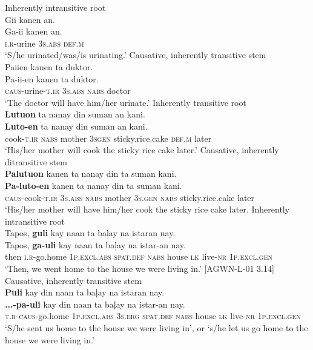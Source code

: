\ea
\label{bkm:Ref397062399}
    \ea
    Inherently intransitive root \\
    Gii  kanen  an. \\\smallskip
 \gll Ga-ii  kanen  an. \\
    \textsc{i.r}-urine  3\textsc{s.abs}  \textsc{def.m} \\
    \glt ‘S/he urinated/was/is urinating.'
    \ex
    Causative, inherently transitive stem \\
    Paiien  kanen  ta  duktor. \\\smallskip
 \gll Pa-ii-en  kanen  ta  duktor. \\
    \textsc{caus}-urine-\textsc{t.ir}  3\textsc{s.abs}  \textsc{nabs}  doctor \\
    \glt ‘The doctor will have him/her urinate.’
    \z
\z
\ea
    \ea
    \label{bkm:Ref444336543} 
    Inherently transitive root \\
    \textbf{Lutuon}  ta  nanay  din  suman  an  kani. \\\smallskip
 \gll  \textbf{Luto-en}  ta  nanay  din  suman  an  kani. \\
    cook-\textsc{t.ir}  \textsc{nabs}  mother  3\textsc{sgen}  sticky.rice.cake  \textsc{def.m} later \\
    \glt ‘His/her mother will cook the sticky rice cake later.'
    \ex
    \label{bkm:Ref395074775}
    Causative, inherently ditransitive stem \\
    \textbf{Palutuon}  kanen  ta  nanay  din  ta  suman  kani. \\\smallskip
 \gll \textbf{Pa-luto-en}  kanen  ta  nanay  din  ta  suman  kani. \\
    \textsc{caus}-cook-\textsc{t.ir}  3\textsc{s.abs}  \textsc{nabs}  mother  3\textsc{s.gen}  \textsc{nabs}  sticky.rice.cake  later \\
    \glt ‘His/her mother will have him/her cook the sticky rice cake later.
    \z
\z
\ea 
    \ea
    Inherently intransitive root \\
    Tapos,  \textbf{guli}  kay  naan  ta  baļay  na  istaran nay. \\\smallskip
 \gll Tapos,  \textbf{ga-uli}  kay  naan  ta  baļay  na  istar-an nay. \\
    then  \textsc{i.r}-go.home  1\textsc{p.excl.abs}  \textsc{spat.def} \textsc{nabs}  house  \textsc{lk}  live-\textsc{nr} 1\textsc{p.excl.gen} \\
    \glt ‘Then, we went home to the house we were living in.’ [AGWN-L-01 3.14]
    \ex
    Causative, inherently transitive stem \\
    \textbf{Puli}  kay  din  naan  ta  baļay na istaran  nay. \\\smallskip
 \gll \textbf{...-pa-uli}  kay  din  naan  ta  baļay na istar-an  nay. \\
    \textsc{t.r-caus}-go.home  1\textsc{p.excl.abs} 3\textsc{s.erg}  \textsc{spat.def}  \textsc{nabs}  house
    \textsc{lk} live-\textsc{nr} 1\textsc{p.excl.gen} \\
    \glt `S/he sent us home to the house we were living in’, or ‘s/he let us go home to the house we were living in.’
    \z
\z

